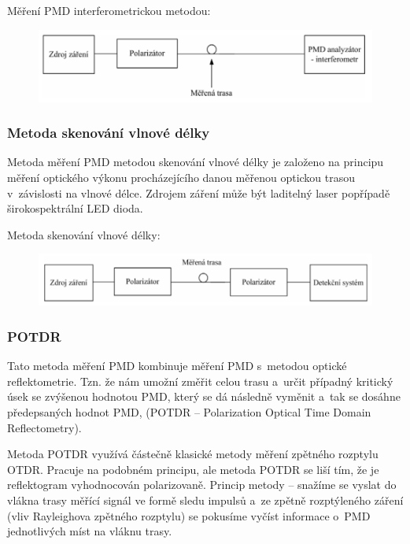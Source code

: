 Měření PMD interferometrickou metodou:
\begin{figure}[!ht]
  \begin{center}
    \includegraphics[scale=1]{obrazky/merPMD1.png}
  \end{center}
\end{figure}

\subsubsection{Metoda skenování vlnové délky}
Metoda měření PMD metodou skenování vlnové délky je založeno na principu měření optického výkonu procházejícího danou měřenou optickou trasou v~závislosti na vlnové délce. Zdrojem záření může být laditelný laser popřípadě širokospektrální LED dioda.

Metoda skenování vlnové délky:
\begin{figure}[!ht]
  \begin{center}
    \includegraphics[scale=1]{obrazky/merPMD2.png}
  \end{center}
\end{figure}

\subsubsection{POTDR}
Tato metoda měření PMD kombinuje měření PMD s~metodou optické reflektometrie. Tzn. že nám umožní změřit celou trasu a~určit případný kritický úsek se zvýšenou hodnotou PMD, který se dá následně vyměnit a~tak se dosáhne předepsaných hodnot PMD, (POTDR – Polarization Optical Time Domain Reflectometry).

Metoda POTDR využívá částečně klasické metody měření zpětného rozptylu OTDR. Pracuje na podobném principu, ale metoda POTDR se liší tím, že je reflektogram vyhodnocován polarizovaně. Princip metody – snažíme se vyslat do vlákna trasy měřící signál ve formě sledu impulsů a~ze zpětně rozptýleného záření (vliv Rayleighova zpětného rozptylu) se pokusíme vyčíst informace o~PMD jednotlivých míst na vláknu trasy.


